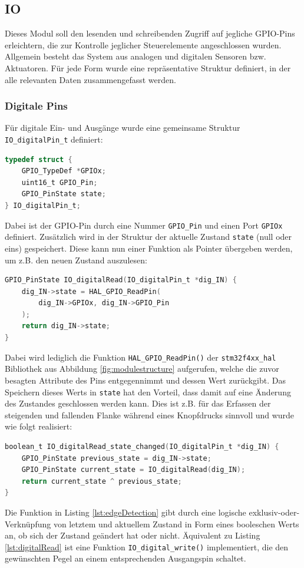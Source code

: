 \subsection{IO}
Dieses Modul soll den lesenden und schreibenden Zugriff auf jegliche GPIO-Pins erleichtern, die zur Kontrolle jeglicher Steuerelemente angeschlossen wurden. Allgemein besteht das System aus analogen und digitalen Sensoren bzw. Aktuatoren. Für jede Form wurde eine repräsentative Struktur definiert, in der alle relevanten Daten zusammengefasst werden.
\subsubsection{Digitale Pins}
Für digitale Ein- und Ausgänge wurde eine gemeinsame Struktur \verb|IO_digitalPin_t| definiert:
\begin{lstlisting}[language=C, caption={Struktur für digitale Pins}, label={lst:digitalPin}]
typedef struct {
	GPIO_TypeDef *GPIOx;
	uint16_t GPIO_Pin;
	GPIO_PinState state;
} IO_digitalPin_t;
\end{lstlisting}
Dabei ist der GPIO-Pin durch eine Nummer \verb|GPIO_Pin| und einen Port \verb|GPIOx| definiert. Zusätzlich wird in der Struktur der aktuelle Zustand \verb|state| (null oder eins) gespeichert. Diese kann nun einer Funktion als Pointer übergeben werden, um z.B. den neuen Zustand auszulesen:
\begin{lstlisting}[language=C, caption={Einlesen eines digitalen Pin-Zustands}, label={lst:digitalRead}]
GPIO_PinState IO_digitalRead(IO_digitalPin_t *dig_IN) {
	dig_IN->state = HAL_GPIO_ReadPin(
		dig_IN->GPIOx, dig_IN->GPIO_Pin
	);
	return dig_IN->state;
}
\end{lstlisting}
Dabei wird lediglich die Funktion \verb|HAL_GPIO_ReadPin()| der \verb|stm32f4xx_hal| Bibliothek aus Abbildung \ref{fig:modulestructure} aufgerufen, welche die zuvor besagten Attribute des Pins entgegennimmt und dessen Wert zurückgibt. Das Speichern dieses Werts in \verb|state| hat den Vorteil, dass damit auf eine Änderung des Zustandes geschlossen werden kann. Dies ist z.B. für das Erfassen der steigenden und fallenden Flanke während eines Knopfdrucks sinnvoll und wurde wie folgt realisiert:
\begin{lstlisting}[language=C, caption={Detektion einer Flanke}, label={lst:edgeDetection}]
boolean_t IO_digitalRead_state_changed(IO_digitalPin_t *dig_IN) {
	GPIO_PinState previous_state = dig_IN->state;
	GPIO_PinState current_state = IO_digitalRead(dig_IN);
	return current_state ^ previous_state;
}
\end{lstlisting}
Die Funktion in Listing \ref{lst:edgeDetection} gibt durch eine logische exklusiv-oder-Verknüpfung von letztem und aktuellem Zustand in Form eines booleschen Werts an, ob sich der Zustand geändert hat oder nicht. Äquivalent zu Listing \ref{lst:digitalRead} ist eine Funktion \verb|IO_digital_write()| implementiert, die den gewünschten Pegel an einem entsprechenden Ausgangspin schaltet.

